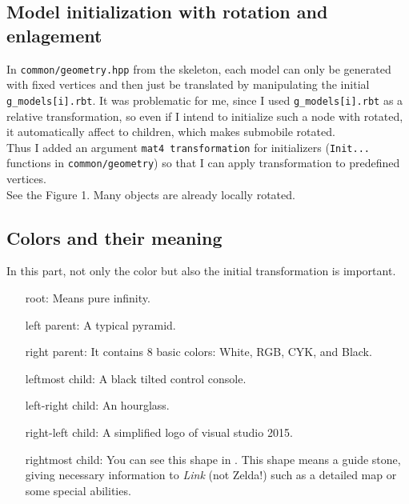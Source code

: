 \documentclass[11pt]{article}
\begin{document}
\subsection{Model initialization with rotation and enlagement} \label{ssec:6.1}
In \texttt{common/geometry.hpp} from the skeleton, each model can only be generated with fixed vertices and then just be translated by manipulating the initial \texttt{g\_models[i].rbt}. It was problematic for me, since I used \texttt{g\_models[i].rbt} as a relative transformation, so even if I intend to initialize such a node with rotated, it automatically affect to children, which makes submobile rotated. \\
Thus I added an argument \texttt{mat4 transformation} for initializers (\texttt{Init...} functions in \texttt{common/geometry}) so that I can apply transformation to predefined vertices. \\
See the Figure 1. Many objects are already locally rotated.
\subsection{Colors and their meaning} \label{ssec:6.2}
In this part, not only the color but also the initial transformation is important.
\begin{itemize}
	\item [root:] Means pure infinity.
	\item [left parent:] A typical pyramid.
	\item [right parent:] It contains 8 basic colors: White, RGB, CYK, and Black.
	\item [leftmost child:] A black tilted control console.
	\item [left-right child:] An hourglass.
	\item [right-left child:] A simplified logo of visual studio 2015.
	\item [rightmost child:] You can see this shape in . This shape means a guide stone, giving necessary information to \textit{Link} (not Zelda!) such as a detailed map or some special abilities.
\end{itemize}
\end{document}
